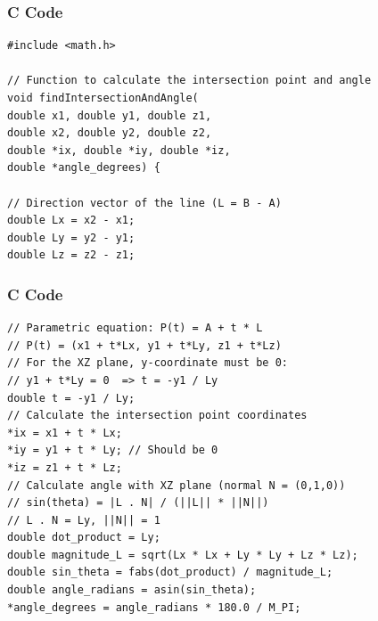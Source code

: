 \documentclass{beamer}
\begin{document}
\begin{frame}[fragile]
\frametitle{C Code}
\begin{lstlisting}
#include <math.h> 

// Function to calculate the intersection point and angle
void findIntersectionAndAngle(
double x1, double y1, double z1,
double x2, double y2, double z2,
double *ix, double *iy, double *iz,
double *angle_degrees) {

// Direction vector of the line (L = B - A)
double Lx = x2 - x1;
double Ly = y2 - y1;
double Lz = z2 - z1;
\end{lstlisting}
\end{frame}
\begin{frame}[fragile]
\frametitle{C Code}
\begin{lstlisting}
// Parametric equation: P(t) = A + t * L
// P(t) = (x1 + t*Lx, y1 + t*Ly, z1 + t*Lz)
// For the XZ plane, y-coordinate must be 0:
// y1 + t*Ly = 0  => t = -y1 / Ly
double t = -y1 / Ly;
// Calculate the intersection point coordinates
*ix = x1 + t * Lx;
*iy = y1 + t * Ly; // Should be 0
*iz = z1 + t * Lz;
// Calculate angle with XZ plane (normal N = (0,1,0))
// sin(theta) = |L . N| / (||L|| * ||N||)
// L . N = Ly, ||N|| = 1
double dot_product = Ly;
double magnitude_L = sqrt(Lx * Lx + Ly * Ly + Lz * Lz);
double sin_theta = fabs(dot_product) / magnitude_L;
double angle_radians = asin(sin_theta);
*angle_degrees = angle_radians * 180.0 / M_PI;
\end{lstlisting}
\end{frame}
\end{document}
